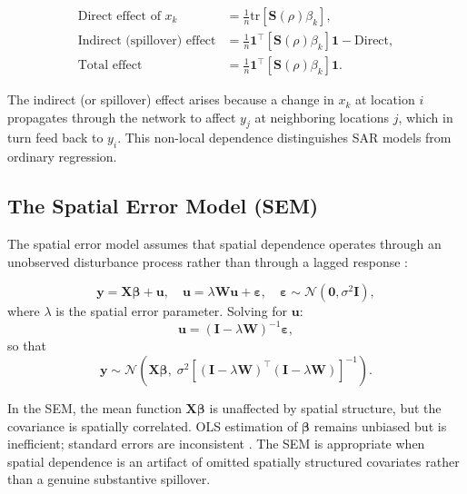 \documentclass[conference]{IEEEtran}
\theoremstyle{definition}
\begin{document}
\begin{align}
\text{Direct effect of } x_k &= \frac{1}{n}\mathrm{tr}\!\left[\mathbf{S}(\rho)\beta_k\right], \label{eq:direct}\\
\text{Indirect (spillover) effect} &= \frac{1}{n}\mathbf{1}^\top\!\left[\mathbf{S}(\rho)\beta_k\right]\!\mathbf{1} - \text{Direct}, \label{eq:indirect}\\
\text{Total effect} &= \frac{1}{n}\mathbf{1}^\top\!\left[\mathbf{S}(\rho)\beta_k\right]\!\mathbf{1}. \label{eq:total}
\end{align}

The indirect (or spillover) effect arises because a change in $x_k$ at location $i$ propagates through the network to affect $y_j$ at neighboring locations $j$, which in turn feed back to $y_i$. This non-local dependence distinguishes SAR models from ordinary regression.

\subsection{The Spatial Error Model (SEM)}

The spatial error model assumes that spatial dependence operates through an unobserved disturbance process rather than through a lagged response \cite{anselin1988spatial}:

\begin{equation}
\label{eq:sem}
\mathbf{y} = \mathbf{X}\bm{\beta} + \bm{u}, \quad \bm{u} = \lambda \mathbf{W}\bm{u} + \bm{\varepsilon}, \quad \bm{\varepsilon} \sim \mathcal{N}(\mathbf{0}, \sigma^2\mathbf{I}),
\end{equation}
where $\lambda$ is the spatial error parameter. Solving for $\bm{u}$:
\begin{equation}
\bm{u} = (\mathbf{I} - \lambda\mathbf{W})^{-1}\bm{\varepsilon},
\end{equation}
so that
\begin{equation}
\mathbf{y} \sim \mathcal{N}\!\left(\mathbf{X}\bm{\beta},\; \sigma^2 [(\mathbf{I}-\lambda\mathbf{W})^\top(\mathbf{I}-\lambda\mathbf{W})]^{-1}\right).
\end{equation}

In the SEM, the mean function $\mathbf{X}\bm{\beta}$ is unaffected by spatial structure, but the covariance is spatially correlated. OLS estimation of $\bm{\beta}$ remains unbiased but is inefficient; standard errors are inconsistent \cite{anselin2001rao}. The SEM is appropriate when spatial dependence is an artifact of omitted spatially structured covariates rather than a genuine substantive spillover.
\end{document}
